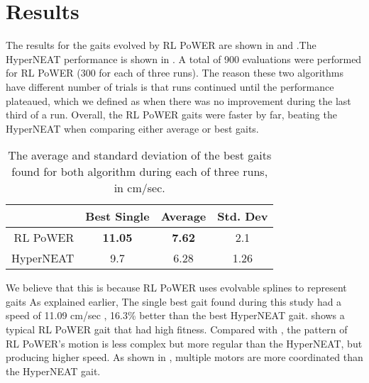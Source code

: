 \section{Results}

The results for the gaits evolved by RL PoWER are shown in  and .The HyperNEAT performance is shown in . A total of 900 evaluations were performed for RL PoWER (300 for each of three runs). The reason these two algorithms have different number of trials is that runs continued until the performance plateaued, which we defined as when there was no improvement during the last third of a run. Overall, the RL PoWER gaits were
faster by far, beating the HyperNEAT when comparing
either average or best gaits.


\begin{table}
\begin{center}
\begin{tabular}{|r|c|c|c|}
\hline
                                & Best Single & Average  & Std. Dev \\
\hline                                    
\hline                                    
RL PoWER                       & {\bf 11.05} & {\bf 7.62}   &    2.1   \\
\hline
HyperNEAT                       & 9.7 & 6.28   & 1.26   \\
\hline
\end{tabular}
\caption{The average and standard deviation of the best gaits found
  for both algorithm during each of three runs, in cm/sec.}
\end{center}
\end{table}



We believe that this is because RL PoWER uses evolvable splines to represent gaits As explained earlier,  
The single best gait found during this study had a speed of 11.09 cm/sec ,  16.3\% better than the best HyperNEAT gait.  shows a typical RL PoWER gait that had high fitness. Compared with , the pattern of RL PoWER's motion is less
complex but more regular than the HyperNEAT, but producing higher speed. As shown in 
, multiple motors are more coordinated than the HyperNEAT gait.

